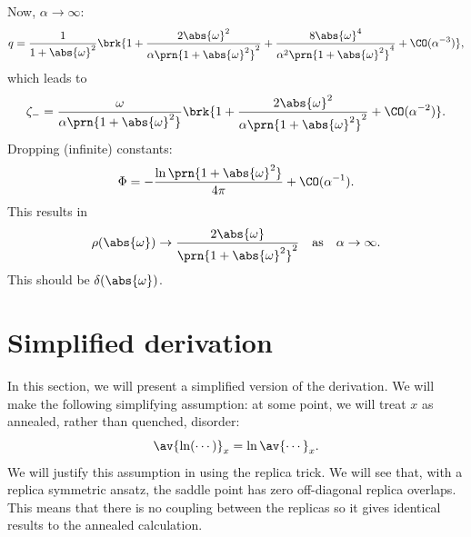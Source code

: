 \documentclass[12pt]{article}
\newcommand{\oa}{\abs{\omega}}
\newcommand{\opo}{\prn{1+\abs{\omega}^2}}
\begin{document}
Now, $\alpha\to\infty$:
%
\begin{equation}\label{eq:rsatoinfty}
  q =
  \frac{1}{1+\abs{\omega}^2} \brk{1 + \frac{2\abs{\omega}^ 2}{\alpha\opo^2}
       + \frac{8\abs{\omega}^4}{\alpha^2\opo^4}
       + \CO(\alpha^{-3})},
\end{equation}
%
which leads to
%
\begin{equation}\label{eq:zmatoinfty}
  \zeta_- =
  \frac{\omega}{\alpha\opo} \brk{1 + \frac{2\abs{\omega}^2}{\alpha\opo^2} + \CO(\alpha^{-2})}.
\end{equation}
%
Dropping (infinite) constants:
%
\begin{equation}\label{eq:phiatoinfty}
  \Phi = -\frac{\ln\opo}{4\pi} + \CO(\alpha^{-1}).
\end{equation}
%
This results in
%
\begin{equation}\label{eq:rhoatoinfty}
  \rho(\oa) \to \frac{2\oa}{\opo^2}
  \quad\text{as}\quad
  \alpha\to\infty.
\end{equation}
%
This should be $\delta(\oa)$.



\section{Simplified derivation}\label{sec:simplederiv}

In this section, we will present a simplified version of the derivation.
We will make the following simplifying assumption: at some point, we will treat $x$ as annealed, rather than quenched, disorder:
%
\begin{equation}\label{eq:annealed}
  \av{\ln (\cdots)}_x = \ln\av{\cdots}_x.
\end{equation}
%
We will justify this assumption in  using the replica trick.
We will see that, with a replica symmetric ansatz, the saddle point has zero off-diagonal replica overlaps.
This means that there is no coupling between the replicas so it gives identical results to the annealed calculation.
\end{document}

